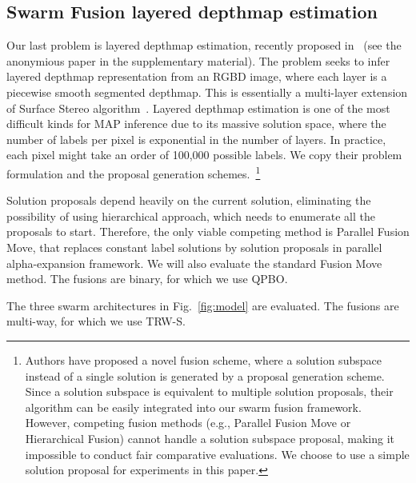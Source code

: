 \subsection{Swarm Fusion layered depthmap estimation}
Our last problem is layered depthmap estimation, recently proposed
in~\cite{layered_depthmap} (see the anonymious paper in the
supplementary material).  The problem seeks to infer layered depthmap
representation from an RGBD image, where each layer is a piecewise
smooth segmented depthmap. This is essentially a multi-layer extension
of Surface Stereo algorithm~\cite{surface_stereo}.
%
Layered depthmap estimation is one of the most difficult kinds for MAP
inference due to its massive solution space, where the number of labels
per pixel is exponential in the number of layers. In practice, each
pixel might take an order of 100,000 
possible labels. We copy their problem formulation and the proposal
generation schemes.~\footnote{Authors have proposed a novel fusion scheme,
where a solution subspace instead of a single solution is generated by a
proposal generation scheme. Since a solution subspace is equivalent to
multiple solution proposals, their algorithm can be easily integrated
into our swarm fusion framework.  However, competing fusion methods
(e.g., Parallel Fusion Move or Hierarchical Fusion) cannot handle a
solution subspace proposal, making it impossible to conduct fair
comparative evaluations. We choose to use a simple solution proposal for
experiments in this paper.}


Solution proposals depend heavily on the current solution, eliminating
the possibility of using hierarchical approach, which needs to enumerate
all the proposals to start. Therefore, the only viable competing method
is Parallel Fusion Move, that replaces constant label solutions by
solution proposals in parallel alpha-expansion framework. We will also
evaluate the standard Fusion Move method.
%
The fusions are binary, for which we use QPBO.



The three swarm architectures in Fig.~\ref{fig:model} are evaluated. The
fusions are multi-way, for which we use TRW-S.

